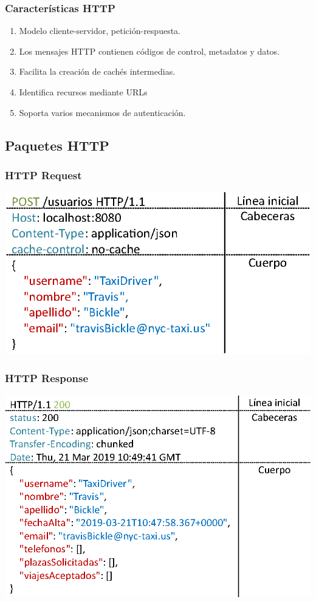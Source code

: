 \documentclass[handout,a4paper,slidestop,xcolor=pst,blue]{beamer}
\begin{document}
\begin{frame}[c]
    \frametitle{Características HTTP}
    \begin{enumerate}[<+->]
        \item Modelo cliente-servidor, petición-respuesta.
        \item Los mensajes HTTP contienen códigos de control, metadatos y datos.
        \item Facilita la creación de cachés intermedias.
        \item Identifica recursos mediante URLs
        \item Soporta varios mecanismos de autenticación.
    \end{enumerate}
\end{frame}

\subsection{Paquetes HTTP}

\begin{frame}[c,fragile]
    \frametitle{HTTP Request}
    \begin{center}
        \includegraphics[width=0.8\linewidth]{images/http/httpRequest.eps}
    \end{center}
\end{frame}

\begin{frame}[c,fragile]
    \frametitle{HTTP Response}
    \begin{center}
        \includegraphics[width=0.8\linewidth]{images/http/httpResponse.eps}
    \end{center}
\end{frame}
\end{document}
